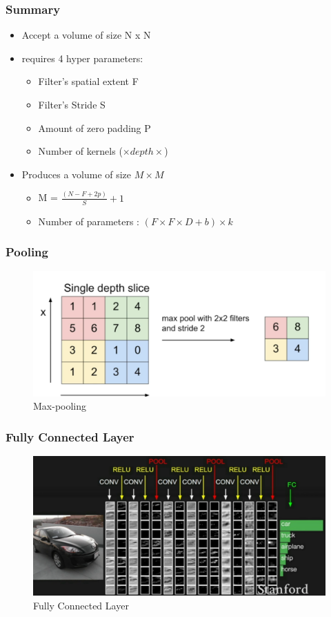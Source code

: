 \documentclass{beamer}
\begin{document}
\begin{frame}
\frametitle{Summary}
\begin{itemize}
	\item Accept a volume of size N x N 
	\item requires 4 hyper parameters:
	\begin{itemize}
		\item Filter's spatial extent F
		\item Filter's Stride S
		\item Amount of zero padding P
		\item Number of kernels ($\times depth \times$)
	\end{itemize}
	
     \item Produces a volume of size $M \times M$
     \begin{itemize}
     	\item M = $ \frac{(N - F + 2p)}{S} + 1 $
     	\item Number of parameters : $ (F \times F \times D + b) \times k $
     \end{itemize}
\end{itemize}

\end{frame}
\begin{frame}
\frametitle{Pooling}

\begin{figure}
	\includegraphics[width=\linewidth]{Pics/pooling.png}
	\caption{Max-pooling}
\end{figure}

\end{frame}
\begin{frame}
\frametitle{Fully Connected Layer}

\begin{figure}
	\includegraphics[width=\linewidth]{Pics/cexample.png}
	\caption{Fully Connected Layer}
\end{figure}

\end{frame}
\end{document}
